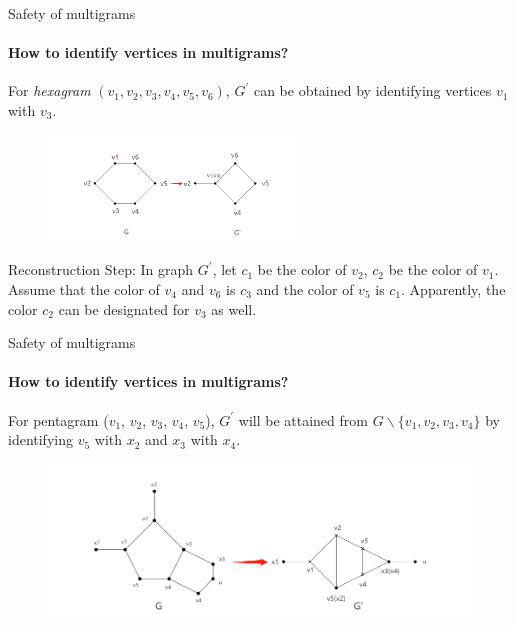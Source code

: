 \documentclass{beamer}
\begin{document}
\begin{frame}{Safety of multigrams}
\framesubtitle{How to identify vertices in multigrams?}
\begin{block}{}
For \textit{hexagram} $(v_1, v_2, v_3, v_4, v_5, v_6)$, $G^{'}$ can be obtained by identifying vertices $v_1$ with $v_3$. 
\end{block}
\begin{figure}[H] %
\centering %
\includegraphics[width=0.6\textwidth]{figure/identifyingv1v32.png} 
\label{figure} %

\end{figure}
\begin{block}{Reconstruction Step:}
In graph $G^{'}$, let $c_1$ be the color of $v_2$, $c_2$ be the color of $v_1$. Assume that the color of $v_4$ and $v_6$ is $c_3$ and the color of $v_5$ is $c_1$. Apparently, the color $c_2$ can be designated for $v_3$ as well.
\end{block}
\end{frame}

\begin{frame}{Safety of multigrams}
\framesubtitle{How to identify vertices in multigrams?}
\begin{block}{}
For pentagram ($v_1$, $v_2$, $v_3$, $v_4$, $v_5$), $G^{'}$ will be attained from $G \backslash \{v_1, v_2, v_3, v_4\}$ by identifying $v_5$ with $x_2$ and $x_3$ with $x_4$.
\end{block}

\begin{figure}[H] %
\centering %
\includegraphics[width=1\textwidth]{figure/pentagramidentift.png} 
\label{figure} %
\end{figure}

\end{frame}
\end{document}

